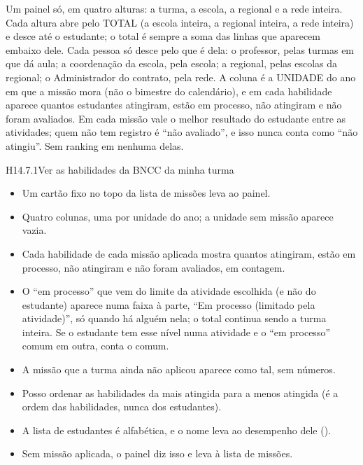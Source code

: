 
Um painel só, em quatro alturas: a turma, a escola, a regional e a rede
inteira. Cada altura abre pelo TOTAL (a escola inteira, a regional inteira, a
rede inteira) e desce até o estudante; o total é sempre a soma das linhas que
aparecem embaixo dele. Cada pessoa só desce pelo que é dela: o professor, pelas
turmas em que dá aula; a coordenação da escola, pela escola; a regional, pelas
escolas da regional; o Administrador do contrato, pela rede. A coluna é a
UNIDADE do ano em que a missão mora (não o bimestre do calendário), e em cada
habilidade aparece quantos estudantes atingiram, estão em processo, não
atingiram e não foram avaliados. Em cada missão vale o melhor resultado do
estudante entre as atividades; quem não tem registro é \enquote{não
avaliado}, e isso nunca conta como \enquote{não atingiu}. Sem ranking em
nenhuma delas.

\begin{historia}{H14.7.1}{Ver as habilidades da BNCC da minha turma}{\pronto}
\aceite
\begin{itemize}
  \item Um cartão fixo no topo da lista de missões leva ao painel.
  \item Quatro colunas, uma por unidade do ano; a unidade sem missão aparece
    vazia.
  \item Cada habilidade de cada missão aplicada mostra quantos atingiram, estão
    em processo, não atingiram e não foram avaliados, em contagem.
  \item O \enquote{em processo} que vem do limite da atividade escolhida (e
    não do estudante) aparece numa faixa à parte, \enquote{Em processo
    (limitado pela atividade)}, só quando há alguém nela; o total continua sendo
    a turma inteira. Se o estudante tem esse nível numa atividade e o
    \enquote{em processo} comum em outra, conta o comum.
  \item A missão que a turma ainda não aplicou aparece como tal, sem números.
  \item Posso ordenar as habilidades da mais atingida para a menos atingida
    (é a ordem das habilidades, nunca dos estudantes).
  \item A lista de estudantes é alfabética, e o nome leva ao desempenho dele
    ().
  \item Sem missão aplicada, o painel diz isso e leva à lista de missões.
\end{itemize}
\end{historia}


